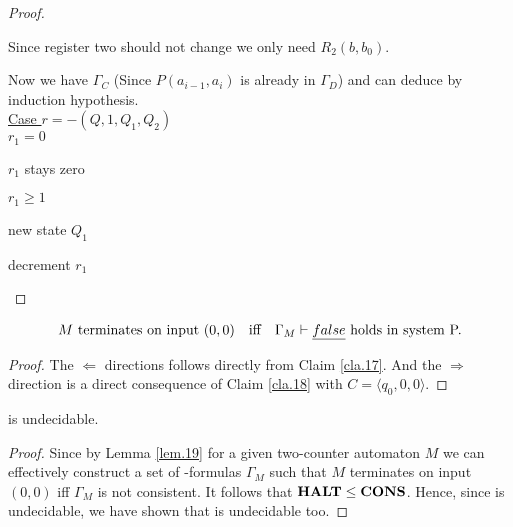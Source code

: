 \begin{proof}
	\begin{figure}[H]
		
	\end{figure}
	Since register two should not change we only need $R_2(b,b_0)$.
	
	\begin{figure}[H]
		
	\end{figure}
	Now we have $\Gamma_C$ (Since $P(a_{i-1},a_i)$ is already in $\Gamma_D$) and can deduce \false{} by induction hypothesis.\\
	\underline{Case $r=-(Q,1,Q_1,Q_2)$}
	\\\uline{$r_1=0$}
	
	\begin{figure}[H]
		
	\end{figure}
	
	$r_1$ stays zero
	
	\begin{figure}[H]
		
	\end{figure}
	\uline{$r_1\geq1$}
	
	new state $Q_1$
	
	\begin{figure}[H]
		
	\end{figure}
	
	decrement $r_1$
	
	\begin{figure}[H]
		
	\end{figure}
	
\end{proof}

\begin{lemma}\label{lem.19}
	\begin{align*} %
		  & \text{$M$ terminates on input $(0,0)$} &   & \text{iff} & \text{$\Gamma_M\vdash\false$ holds in system P.} 
	\end{align*}
\end{lemma}
\begin{proof}
	The $\Leftarrow$ directions follows directly from Claim \ref{cla.17}. And the $\Rightarrow$ direction is a direct consequence of Claim \ref{cla.18} with $C=\langle q_0,0,0\rangle$.
\end{proof}

\begin{theorem}
	\PCons{} is undecidable.
\end{theorem}
\begin{proof}
	Since by Lemma \ref{lem.19} for a given two-counter automaton $M$ we can effectively construct a set of \SysP-formulas $\Gamma_M$ such that $M$ terminates on input $(0,0)$ iff $\Gamma_M$ is not consistent. It follows that $\textbf{HALT}\leq\textbf{CONS}$. Hence, since \autHalt{} is undecidable, we have shown that \PCons{} is undecidable too.
\end{proof}

